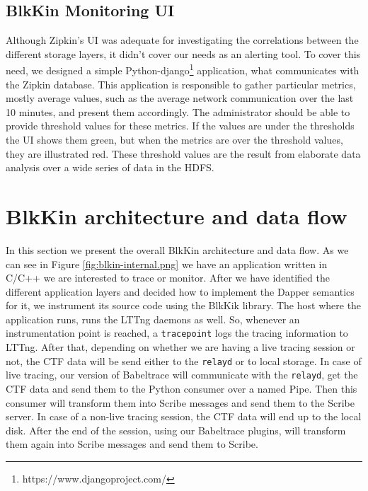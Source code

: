 \subsection{BlkKin Monitoring UI}
Although Zipkin's UI was adequate for investigating the correlations between the
different storage layers, it didn't cover our needs as an alerting tool. To
cover this need, we designed a simple
Python-django\footnote{https://www.djangoproject.com/} application, what
communicates with the Zipkin database. This application is responsible to gather
particular metrics, mostly average values, such as the average network
communication over the last 10 minutes, and present them accordingly. The
administrator should be able to provide threshold values for these metrics. If
the values are under the thresholds the UI shows them green, but when the
metrics are over the threshold values, they are illustrated red. These threshold
values are the result from elaborate data analysis over a wide series of data in
the HDFS.

\section{BlkKin architecture and data flow}\label{sec:flow}

In this section we present the overall BlkKin architecture and data flow. As we
can see in Figure \ref{fig:blkin-internal.png} we have an application written in
C/C++ we are interested to trace or monitor. After we have identified the
different application layers and decided how to implement the Dapper semantics
for it, we instrument its source code using the BlkKik library. The host where
the application runs, runs the LTTng daemons as well. So, whenever an
instrumentation point is reached, a \texttt{tracepoint} logs the tracing
information to LTTng.  After that, depending on whether we are having a live
tracing session or not, the CTF data will be send either to the \texttt{relayd}
or to local storage. In case of live tracing, our version of Babeltrace will
communicate with the \texttt{relayd}, get the CTF data and send them to the
Python consumer over a named Pipe. Then this consumer will transform them into
Scribe messages and send them to the Scribe server. In case of a non-live
tracing session, the CTF data will end up to the local disk. After the end of
the session, using our Babeltrace plugins, will transform them again into Scribe
messages and send them to Scribe.


